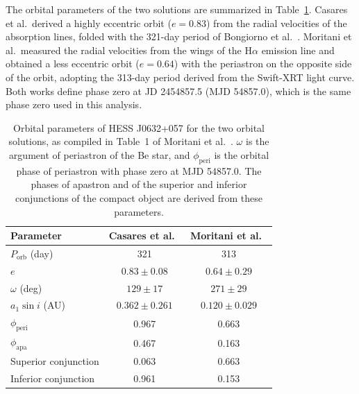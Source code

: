 \documentclass[10pt,letter]{article}
\begin{document}
The orbital parameters of the two solutions are summarized in Table~\ref{tab:orbit}. Casares et al.\ derived a highly eccentric orbit ($e = 0.83$) from the radial velocities of the absorption lines, folded with the 321-day period of Bongiorno et al.~\citep{Bongiorno2011}. Moritani et al.\ measured the radial velocities from the wings of the H$\alpha$ emission line and obtained a less eccentric orbit ($e = 0.64$) with the periastron on the opposite side of the orbit, adopting the 313-day period derived from the Swift-XRT light curve. Both works define phase zero at JD 2454857.5 (MJD 54857.0), which is the same phase zero used in this analysis.

\begin{table}[H]
\centering
\caption{Orbital parameters of HESS J0632+057 for the two orbital solutions, as compiled in Table~1 of Moritani et al.~\citep{Moritani2018}. $\omega$ is the argument of periastron of the Be star, and $\phi_{\mathrm{peri}}$ is the orbital phase of periastron with phase zero at MJD 54857.0. The phases of apastron and of the superior and inferior conjunctions of the compact object are derived from these parameters.}
\label{tab:orbit}
\renewcommand{\arraystretch}{1.25}
\begin{tabular}{l|c|c}
\hline
Parameter & Casares et al.~\citep{Casares2012} & Moritani et al.~\citep{Moritani2018} \\
\hline
$P_{\mathrm{orb}}$ (day)         & 321 & 313 \\
$e$                              & $0.83 \pm 0.08$ & $0.64 \pm 0.29$ \\
$\omega$ (deg)                   & $129 \pm 17$ & $271 \pm 29$ \\
$a_1 \sin i$ (AU)                & $0.362 \pm 0.261$ & $0.120 \pm 0.029$ \\
\hline
$\phi_{\mathrm{peri}}$           & 0.967 & 0.663 \\
$\phi_{\mathrm{apa}}$            & 0.467 & 0.163 \\
Superior conjunction             & 0.063 & 0.663 \\
Inferior conjunction             & 0.961 & 0.153 \\
\hline
\end{tabular}
\end{table}
\end{document}
